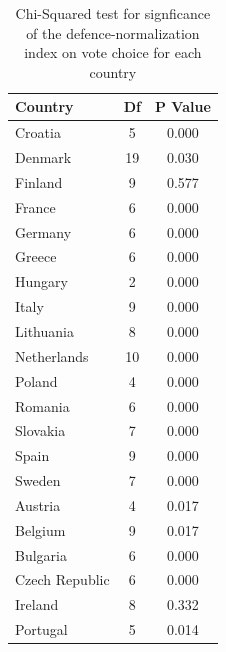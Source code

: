 \begin{table}

\caption{Chi-Squared test for signficance of the defence-normalization index on vote choice for each country\label{tab:chi_square}}
\centering
\begin{tabular}[t]{lcc}
\toprule
Country & Df & P Value\\
\midrule
Croatia & 5 & 0.000\\
Denmark & 19 & 0.030\\
Finland & 9 & 0.577\\
France & 6 & 0.000\\
Germany & 6 & 0.000\\
Greece & 6 & 0.000\\
Hungary & 2 & 0.000\\
Italy & 9 & 0.000\\
Lithuania & 8 & 0.000\\
Netherlands & 10 & 0.000\\
Poland & 4 & 0.000\\
Romania & 6 & 0.000\\
Slovakia & 7 & 0.000\\
Spain & 9 & 0.000\\
Sweden & 7 & 0.000\\
Austria & 4 & 0.017\\
Belgium & 9 & 0.017\\
Bulgaria & 6 & 0.000\\
Czech Republic & 6 & 0.000\\
Ireland & 8 & 0.332\\
Portugal & 5 & 0.014\\
\bottomrule
\end{tabular}
\end{table}
